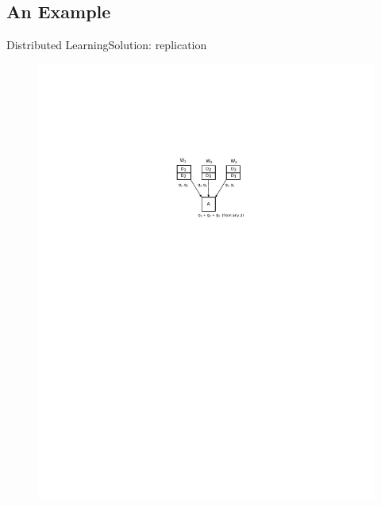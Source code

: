 \documentclass{beamer}
\begin{document}
\subsection{An Example}

\begin{frame}{Distributed Learning}{Solution: replication}

\begin{figure}
    \centering
    \includegraphics[height=.7\textheight]{res/replicate.pdf}
\end{figure}

\end{frame}
\end{document}
